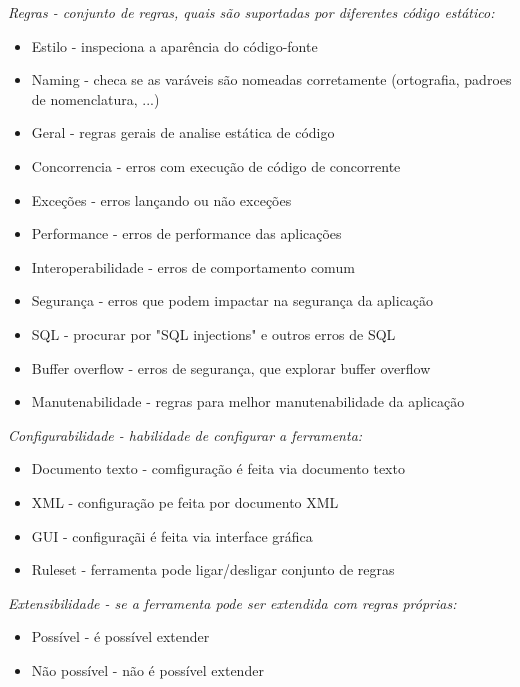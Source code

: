 \begin{description}
  \item {\it Regras - conjunto de regras, quais são suportadas por diferentes código estático:}
    \begin{itemize}
      \item Estilo - inspeciona a aparência do código-fonte
      \item Naming - checa se as varáveis são nomeadas corretamente (ortografia, padroes de nomenclatura, ...)
      \item Geral - regras gerais de analise estática de código
      \item Concorrencia - erros com execução de código de concorrente
      \item Exceções - erros lançando ou não exceções
      \item Performance - erros de performance das aplicações
      \item Interoperabilidade - erros de comportamento comum
      \item Segurança - erros que podem impactar na segurança da aplicação
      \item SQL - procurar por "SQL injections" e outros erros de SQL
      \item Buffer overflow - erros de segurança, que explorar buffer overflow
      \item Manutenabilidade - regras para melhor manutenabilidade da aplicação
    \end{itemize}

  \item {\it Configurabilidade - habilidade de configurar a ferramenta:}
    \begin{itemize}
      \item Documento texto - comfiguração é feita via documento texto
      \item XML - configuração pe feita por documento XML
      \item GUI - configuraçãi é feita via interface gráfica
      \item Ruleset - ferramenta pode ligar/desligar conjunto de regras
    \end{itemize}

  \item {\it Extensibilidade - se a ferramenta pode ser extendida com regras próprias:}
    \begin{itemize}
      \item Possível - é possível extender
      \item Não possível - não é possível extender
    \end{itemize}


\end{description}
